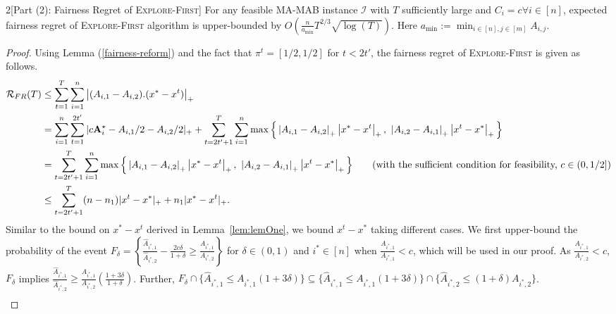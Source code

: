 
\begin{manualtheorem}{2}[Part (2): Fairness Regret of \textsc{Explore-First}]
\label{thm:ExploreFirstFairnessRegret}
For any feasible MA-MAB instance $\mathcal{I}$ with $T$ sufficiently large and $C_i=c \forall i\in [n]$,     expected fairness regret of \textsc{Explore-First} algorithm is upper-bounded by $O\left(\frac{n}{ a_{\min}} T^{2/3} \sqrt{\log(T)} \right)  $.  Here $a_{\min}:=\min_{i\in [n], j\in [m]}A_{i, j}$.
\end{manualtheorem}

\begin{proof}
Using Lemma (\ref{fairness-reform}) and the fact that $\pi^t = [1/2, 1/2]$ for $t<2t'$, the fairness regret of \textsc{Explore-First} is given as follows.
\begin{align} \label{proof:FR-EF}
\mathcal{R}_{FR}(T) & \leq \sum_{t=1}^T\sum_{i=1}^n \left|(A_{i,1}-A_{i,2}).(x^*-x^t)\right|_+ \nonumber \\
    &  = \sum_{i=1}^n\sum_{t=1}^{2t'}|c\Amax_i - A_{i, 1}/2-A_{i, 2}/2|_++\sum_{t=2t'+1}^T\sum_{i=1}^n\max\Big\{ \left|A_{i,1}-A_{i,2}\right|_+\left|x^*-x^t\right|_+,\ \left|A_{i,2}-A_{i,1}\right|_+  \left|x^t - x^*\right|_+\Big\} \nonumber \\
    &  = \sum_{t=2t'+1}^T\sum_{i=1}^n\max\Big\{ \left|A_{i,1}-A_{i,2}\right|_+\left|x^*-x^t\right|_+,\ \left|A_{i,2}-A_{i,1}\right|_+  \left|x^t - x^*\right|_+\Big\} \nonumber \tag{with the sufficient condition for feasibility, $c\in (0, 1/2]$}\\
    & \leq \sum_{t=2t'+1}^T (n-n_1) |x^t - x^*|_+ +  n_1  |x^* - x^t|_+ .
\end{align}
Similar to the bound on $x^*-x^t$ derived in Lemma~\ref{lem:lemOne}, we bound $x^t-x^*$ taking different cases.
\newline
We first upper-bound the probability of the event $F_\delta=\left\{ \frac{\widehat{A}_{i^*, 1}}{\widehat{A}_{i^*, 2}} - \frac{2c\delta}{1+\delta} \geq \frac{A_{i^*, 1}}{A_{i^*, 2}} \right\}$ for $\delta\in (0, 1)$ and $i^*\in [n]$ when $\frac{A_{i^*, 1}}{A_{i^*, 1}}<c$, which will be used in our proof. As $\frac{A_{i^*, 1}}{A_{i^*, 2}}<c$, $F_\delta$ implies $\frac{\widehat{A}_{i^*, 1}}{\widehat{A}_{i^*, 2}}\geq \frac{A_{i^*, 1}}{A_{i^*, 2}}\left(\frac{1+3\delta}{1+\delta} \right)$. 
\newline
Further, $F_\delta \cap \{\widehat{A}_{i^*, 1}\leq A_{i^*, 1}(1+3\delta) \} \subseteq \{\widehat{A}_{i^*, 1}\leq A_{i^*, 1}(1+3\delta) \}\cap \{ \widehat{A}_{i^*, 2}\leq (1+\delta)A_{i^*, 2} \}$.
\begin{align*}

\end{align*}
\end{proof}
